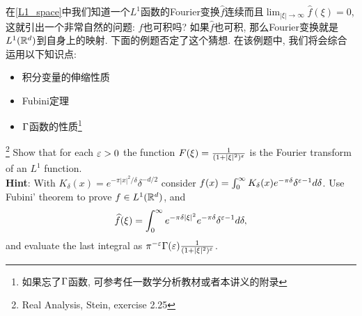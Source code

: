 在\ref{L1_space}中我们知道一个$L^1$函数的Fourier变换$\hat{f}$连续而且$\lim_{|\xi|\to \infty}\hat{f}(\xi) = 0$, 这就引出一个非常自然的问题: $\hat{f}$也可积吗? 如果$\hat{f}$也可积, 那么Fourier变换就是$L^1(\mathbb{R}^d)$到自身上的映射. 下面的例题否定了这个猜想. 在该例题中, 我们将会综合运用以下知识点:
\begin{itemize}
    \item 积分变量的伸缩性质
    \item Fubini定理
    \item $\Gamma$函数的性质\footnote{如果忘了$\Gamma$函数, 可参考任一数学分析教材或者本讲义的附录}
    
\end{itemize}
\begin{example}\footnote{Real Analysis, Stein, exercise 2.25}
    {\everymath{\displaystyle}
    Show that for each $\varepsilon>0$ the function $F(\xi)=\frac{1}{(1+|\xi|^2)^\varepsilon}$ is the Fourier transform of an $L^1$ function. \\
    \textbf{Hint}: With $K_\delta(x)=e^{-\pi|x|^2/\delta} \delta^{-d/2}$ consider $f(x)=\int_0^\infty K_\delta(x)e^{-\pi \delta}\delta^{\varepsilon-1} d\delta$. Use Fubini' theorem to prove $f \in L^1(\mathbb{R}^d)$, and 
    $$\widehat{f}(\xi) = \int_0^\infty e^{-\pi \delta |\xi|^2} e^{-\pi \delta} \delta^{\varepsilon-1} d\delta, $$
    and evaluate the last integral as 
    $\pi^{-\varepsilon}\Gamma(\varepsilon)\frac{1}{(1+|\xi|^2)^\varepsilon}$.
    }
\end{example}
